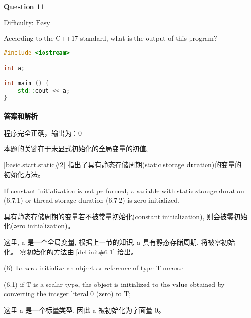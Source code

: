 \documentclass{article}
\begin{document}
	
	\paragraph*{Question 11} $\boxed{\text{Difficulty: Easy}} $			
	
	According to the C++17 standard, what is the output of this program?
	
	\begin{lstlisting}[language=C++]  		
#include <iostream>

int a;

int main () {
	std::cout << a;
}
	\end{lstlisting}
	
	
	\paragraph*{答案和解析} $\boxed{\text{程序完全正确，输出为：0}} $
	
	本题的关键在于未显式初始化的全局变量的初值。
	
	\href{https://timsong-cpp.github.io/cppwp/n4659/basic.start.static#2}{[basic.start.static\#2]} 指出了具有静态存储周期(static storage duration)的变量的初始化方法。
	
	\begin{lightgrayleftbar}
		If constant
		initialization is not performed, a variable with static storage duration (6.7.1) or thread storage duration (6.7.2)
		is zero-initialized.
	\end{lightgrayleftbar}
	
	具有静态存储周期的变量若不被常量初始化(constant initialization), 则会被零初始化(zero initialization)。 
	
	这里, a 是一个全局变量, 根据上一节的知识, a 具有静态存储周期, 将被零初始化。 零初始化的方法由
	\href{https://timsong-cpp.github.io/cppwp/n4659/dcl.init#6.1}{[dcl.init\#6.1]} 给出。
	
	\begin{lightgrayleftbar}
		(6) To zero-initialize an object or reference of type T means:
		
		(6.1) if T is a scalar type, the object is initialized to the value obtained by converting the integer literal 0 (zero) to T;
	\end{lightgrayleftbar}
	这里 a 是一个标量类型, 因此 a 被初始化为字面量 0。
	
\end{document}

